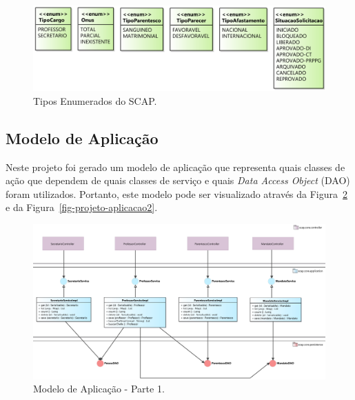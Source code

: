 \begin{figure}[!h]
	\centering
	\includegraphics[scale=0.3]{figuras/fig-projeto-enum} 
	\caption{Tipos Enumerados do SCAP.}
	\label{fig-projeto-enum}
\end{figure}

\subsection{Modelo de Aplicação}
\label{sec-projeto-modelo-aplicacao}

Neste projeto foi gerado um modelo de aplicação que representa quais classes de ação que dependem de quais classes de serviço e quais \textit{Data Access Object} (DAO) foram utilizados. Portanto, este modelo pode ser visualizado através da Figura~\ref{fig-projeto-aplicacao1} e da Figura~\ref{fig-projeto-aplicacao2}. 

\begin{figure}[!h]
	\centering
	\includegraphics[width=1\textwidth]{figuras/fig-projeto-aplicacao1.png}
	\caption{Modelo de Aplicação - Parte 1.}
	\label{fig-projeto-aplicacao1}
\end{figure}

